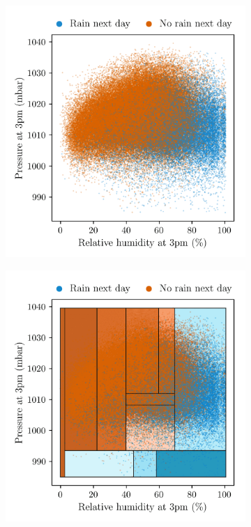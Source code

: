 \begin{figure}[t]
  \centering
  \begin{subfigure}{0.49\textwidth}
    \centering
    \includegraphics[scale=0.64]{graphics/weather_data.png}%
  \end{subfigure}
  \begin{subfigure}{0.49\textwidth}
    \centering
    \includegraphics[scale=0.64]{graphics/weather_data_filled_partition.png}%

\end{subfigure}
\end{figure}
